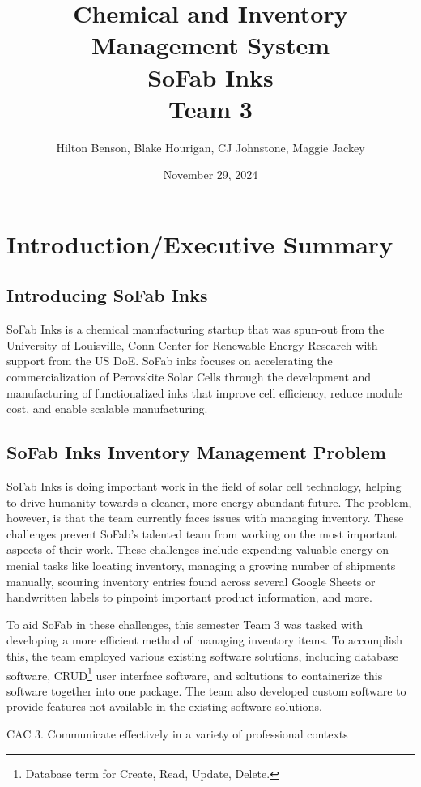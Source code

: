 \documentclass{article}
\title{Chemical and Inventory Management System \\ SoFab Inks \\ Team 3}
\date{November 29, 2024}
\author{Hilton Benson, Blake Hourigan, CJ Johnstone, Maggie Jackey}
\begin{document}
  
\maketitle
\clearpage
\tableofcontents
\clearpage

\section{Introduction\slash Executive Summary} 
\subsection{Introducing SoFab Inks}
SoFab Inks is a chemical manufacturing startup that was spun-out from the University of Louisville, Conn Center for Renewable Energy 
Research with support from the US DoE. SoFab inks focuses on accelerating the commercialization of Perovskite Solar Cells 
through the development and manufacturing of functionalized inks that improve cell efficiency, reduce module cost, and enable scalable 
manufacturing. \cite{sofabinks}
\subsection{SoFab Inks Inventory Management Problem}
SoFab Inks is doing important work in the field of solar cell technology, helping to drive humanity towards a cleaner, more energy 
abundant future. The problem, however, is that the team currently faces issues with managing inventory. These challenges prevent SoFab's
talented team from working on the most important aspects of their work. These challenges include expending valuable energy on menial 
tasks like locating inventory, managing a growing number of shipments manually, scouring inventory entries found across several 
Google Sheets or handwritten labels to pinpoint important product information, and more. 

To aid SoFab in these challenges, this semester Team 3 was tasked with developing a more efficient method of managing inventory items. 
To accomplish this, the team employed various existing software solutions, including database software, CRUD\footnote{Database term
for Create, Read, Update, Delete.} user interface software, and soltutions to containerize this software together into one package. The 
team also developed custom software to provide features not available in the existing software solutions. 

CAC 3. Communicate effectively in a variety of professional contexts 
\end{document}
